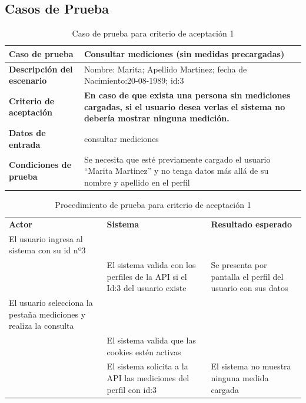 \subsection{Casos de Prueba}


	\begin{table}
	\centering
	\begin{tabular}{|m{4cm}|m{9cm}|}
    	\rowcolor[gray]{0.9}
        \hline 
	    \textbf{Caso de prueba} & \textbf{Consultar mediciones (sin medidas precargadas)}\\  \hline
	    \textbf{Descripción del escenario}& Nombre: Marita; Apellido Martinez; fecha de Nacimiento:20-08-1989; id:3  \\ \hline
	    \textbf{Criterio de aceptación}&  \textbf{En caso de que exista una persona sin mediciones cargadas, si el usuario desea verlas el sistema no debería mostrar ninguna medición.} \\ \hline
        \textbf{Datos de entrada}&  consultar mediciones\\ \hline
        \textbf{Condiciones de  prueba}& Se necesita que esté previamente cargado el usuario ``Marita Martinez'' y no tenga datos más allá de su nombre y apellido en el perfil \\ \hline
	    \end{tabular}
        \caption{Caso de prueba para criterio de aceptación 1}
    	\end{table}
  
{\scriptsize
	\begin{table}[h]
    \centering
	\begin{longtable}{|p{5cm}|p{5cm}|p{5cm}|}
	    \hline \hline \rowcolor[gray]{0.9}
        \multicolumn{3}{||l|}{\textbf{Procedimiento de Prueba - ``Consultar mediciones''}} \\
        \hline \rowcolor[gray]{0.9}
		    \textbf{Actor} & 
	        \textbf{Sistema}& 
        	\textbf{Resultado esperado} \\  
        \hline
	    El usuario ingresa al sistema con su id nº3	& &\\ \hline
        		& El sistema valida con los perfiles de la API si el Id:3 del usuario existe& Se presenta por pantalla el perfil del usuario con sus datos  \\ \hline        
	    El usuario selecciona la pestaña mediciones y realiza la consulta& &\\ \hline
      	&El sistema valida que las cookies estén activas&\\ \hline
   		&El sistema solicita a la API las mediciones del perfil con id:3&El sistema no muestra ninguna medida cargada \\ \hline 
	    \end{longtable}
		\caption{Procedimiento de prueba para criterio de aceptación 1}
    	\end{table}
	}
    
